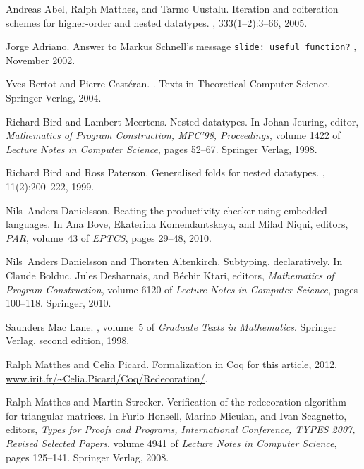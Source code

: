 \documentclass[a4paper,UKenglish]{lipics}
\begin{document}
\begin{thebibliography}{10}

Andreas Abel, Ralph Matthes, and Tarmo Uustalu.
\newblock Iteration and coiteration schemes for higher-order and nested
  datatypes.
, 333(1--2):3--66, 2005.

Jorge Adriano.
\newblock Answer to {M}arkus {S}chnell's message \texttt{slide: useful
  function?}
, November 2002.

Yves Bertot and Pierre Cast{\'e}ran.
.
\newblock Texts in Theoretical Computer Science. Springer Verlag, 2004.

Richard Bird and Lambert Meertens.
\newblock Nested datatypes.
\newblock In Johan Jeuring, editor, {\em Mathematics of {P}rogram
  {C}onstruction, {MPC}'98, Proceedings}, volume 1422 of {\em Lecture Notes in
  Computer Science}, pages 52--67. Springer Verlag, 1998.

Richard Bird and Ross Paterson.
\newblock Generalised folds for nested datatypes.
, 11(2):200--222, 1999.

Nils~Anders Danielsson.
\newblock Beating the productivity checker using embedded languages.
\newblock In Ana Bove, Ekaterina Komendantskaya, and Milad Niqui, editors, {\em
  PAR}, volume~43 of {\em EPTCS}, pages 29--48, 2010.

Nils~Anders Danielsson and Thorsten Altenkirch.
\newblock Subtyping, declaratively.
\newblock In Claude Bolduc, Jules Desharnais, and B{\'e}chir Ktari, editors,
  {\em Mathematics of Program Construction}, volume 6120 of {\em Lecture Notes
  in Computer Science}, pages 100--118. Springer, 2010.

Saunders {Mac Lane}.
, volume~5 of {\em
  Graduate Texts in Mathematics}.
\newblock Springer Verlag, second edition, 1998.

Ralph Matthes and Celia Picard.
\newblock Formalization in {C}oq for this article, 2012.
\newblock \url{www.irit.fr/~Celia.Picard/Coq/Redecoration/}.

Ralph Matthes and Martin Strecker.
\newblock Verification of the redecoration algorithm for triangular matrices.
\newblock In Furio Honsell, Marino Miculan, and Ivan Scagnetto, editors, {\em
  Types for Proofs and Programs, International Conference, TYPES 2007, Revised
  Selected Papers}, volume 4941 of {\em Lecture Notes in Computer Science},
  pages 125--141. Springer Verlag, 2008.


\end{thebibliography}
\end{document}
